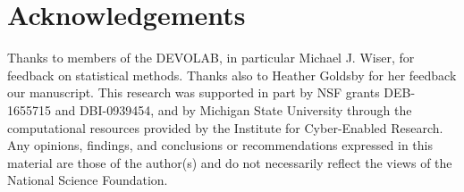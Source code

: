 \section{Acknowledgements}

Thanks to members of the DEVOLAB, in particular Michael J. Wiser, for feedback on statistical methods.
Thanks also to Heather Goldsby for her feedback our manuscript.
This research was supported in part by NSF grants DEB-1655715 and DBI-0939454, and by Michigan State University through the computational resources provided by the Institute for Cyber-Enabled Research.
Any opinions, findings, and conclusions or recommendations expressed in this material are those of the author(s) and do not necessarily reflect the views of the National Science Foundation.
